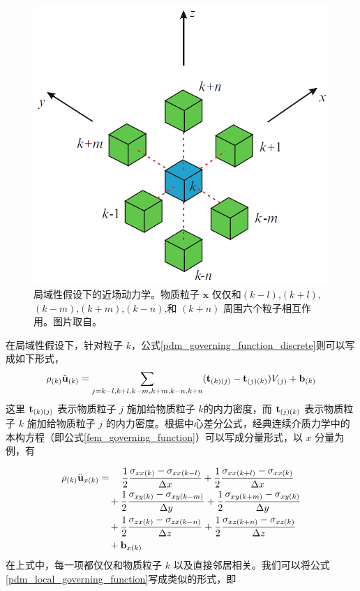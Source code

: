 \begin{figure}[htbp!]
  \centering
  \captionsetup{justification=centering}
  \includegraphics[width=0.5\linewidth]{chap/image/pdm_local}

  \caption{\label{pdm_local}
           局域性假设下的近场动力学。物质粒子 $\mathbf{x}$ 仅仅和$(k-l)$,$(k+l)$,$(k-m)$,$(k+m)$,$(k-n)$,和 $(k+n)$ 周围六个粒子相互作用。图片取自。
          }
\end{figure}

在局域性假设下，针对粒子 $k$，公式\ref{pdm_governing_function_discrete}则可以写成如下形式，
\begin{equation}
\rho_{(k)}\ddot{\mathbf{u}}_{(k)}
= \sum_{j=k-l,k+l,k-m,k+m,k-n,k+n}(\mathbf{t}_{(k)(j)}-\mathbf{t}_{(j)(k)})V_{(j)} + \mathbf{b}_{(k)}
\label{pdm_local_governing_function}
\end{equation}
这里 $\mathbf{t}_{(k)(j)}$ 表示物质粒子 $j$ 施加给物质粒子 $k$的内力密度，而 $\mathbf{t}_{(j)(k)}$ 表示物质粒子 $k$ 施加给物质粒子 $j$ 的内力密度。根据中心差分公式，经典连续介质力学中的本构方程（即公式\ref{fem_governing_function}）可以写成分量形式，以 $x$ 分量为例，有

\begin{equation}
\begin{aligned}
\rho_{(k)}\ddot{\mathbf{u}}_{x(k)} &= \quad \frac{1}{2}\frac{\sigma_{xx(k)} - \sigma_{xx(k-l)}}{\Delta x} + \frac{1}{2}\frac{\sigma_{xx(k+l)} - \sigma_{xx(k)}}{\Delta x}\\
                              &\quad+  \frac{1}{2}\frac{\sigma_{xy(k)} - \sigma_{xy(k-m)}}{\Delta y} + \frac{1}{2}\frac{\sigma_{xy(k+m)} - \sigma_{xy(k)}}{\Delta y}\\
                              &\quad+  \frac{1}{2}\frac{\sigma_{zx(k)} - \sigma_{zx(k-n)}}{\Delta z} + \frac{1}{2}\frac{\sigma_{xz(k+n)} - \sigma_{xz(k)}}{\Delta z}\\
                              &\quad + \mathbf{b}_{x(k)}
\label{fem_local_governing_function}
\end{aligned}
\end{equation}
在上式中，每一项都仅仅和物质粒子 $k$ 以及直接邻居相关。我们可以将公式\ref{pdm_local_governing_function}写成类似的形式，即

